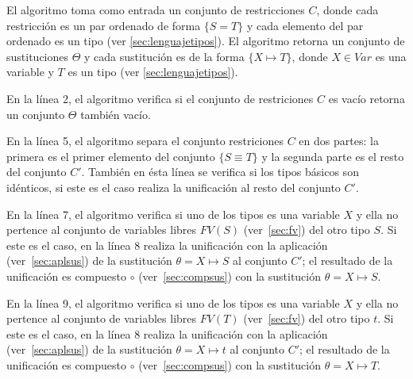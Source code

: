 \documentclass{article}
\begin{document}
\begin{algorithm}[h!]
  \DontPrintSemicolon
  \LinesNumbered
  \caption{$unify(C)$}\label{alg:unificacion}
\end{algorithm}

El algoritmo toma como entrada un conjunto de restricciones $C$, donde
cada restricción es un par ordenado de forma $\{ S = T \}$ y cada
elemento del par ordenado es un tipo (ver \ref{sec:lenguajetipos}). El
algoritmo retorna un conjunto de sustituciones $\Theta$ y cada
sustitución es de la forma $\{ X \mapsto T\}$, donde $X \in Var$ es
una variable y $T$ es un tipo (ver \ref{sec:lenguajetipos}).

En la línea 2, el algoritmo verifica si el conjunto de restriciones
$C$ es vacío retorna un conjunto $\Theta$ también vacío.

En la línea 5, el algoritmo separa el conjunto restriciones $C$ en dos
partes: la primera es el primer elemento del conjunto $\{ S \equiv T
\}$ y la segunda parte es el resto del conjunto $C'$. También en ésta
línea se verifica si los tipos básicos son idénticos, si este es el
caso realiza la unificación al resto del conjunto $C'$.

En la línea 7, el algoritmo verifica si uno de los tipos es una
variable $X$ y ella no pertence al conjunto de variables libres
$FV(S)$ (ver~\ref{sec:fv}) del otro tipo $S$. Si este es el caso, en
la línea 8 realiza la unificación con la aplicación
(ver~\ref{sec:aplsus}) de la sustitución $\theta = X \mapsto S $ al
conjunto $C'$; el resultado de la unificación es compuesto $\circ$
(ver~\ref{sec:compsus}) con la sustitución $\theta = X \mapsto S $.

En la línea 9, el algoritmo verifica si uno de los tipos es una
variable $X$ y ella no pertence al conjunto de variables libres
$FV(T)$ (ver~\ref{sec:fv}) del otro tipo $t$. Si este es el caso, en
la línea 8 realiza la unificación con la aplicación
(ver~\ref{sec:aplsus}) de la sustitución $\theta = X \mapsto t $ al
conjunto $C'$; el resultado de la unificación es compuesto $\circ$
(ver~\ref{sec:compsus}) con la sustitución $\theta = X \mapsto T $.
\end{document}
